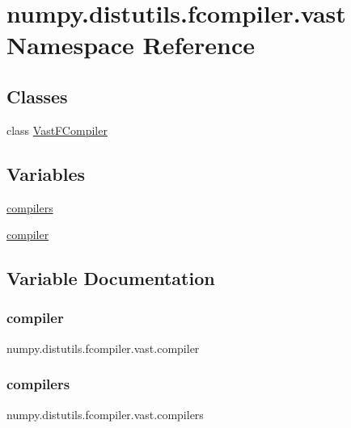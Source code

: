 \hypertarget{namespacenumpy_1_1distutils_1_1fcompiler_1_1vast}{}\section{numpy.\+distutils.\+fcompiler.\+vast Namespace Reference}
\label{namespacenumpy_1_1distutils_1_1fcompiler_1_1vast}
\subsection*{Classes}
\begin{DoxyCompactItemize}
\item 
class \hyperlink{classnumpy_1_1distutils_1_1fcompiler_1_1vast_1_1VastFCompiler}{Vast\+F\+Compiler}
\end{DoxyCompactItemize}
\subsection*{Variables}
\begin{DoxyCompactItemize}
\item 
\hyperlink{namespacenumpy_1_1distutils_1_1fcompiler_1_1vast_a63d584bbe7055d4c64f75986e80eb17b}{compilers}
\item 
\hyperlink{namespacenumpy_1_1distutils_1_1fcompiler_1_1vast_a17515405b8577a0686b6d8c0d8144f00}{compiler}
\end{DoxyCompactItemize}


\subsection{Variable Documentation}
\mbox{\label{namespacenumpy_1_1distutils_1_1fcompiler_1_1vast_a17515405b8577a0686b6d8c0d8144f00}} 
\subsubsection{\texorpdfstring{compiler}{compiler}}
{\footnotesize\ttfamily numpy.\+distutils.\+fcompiler.\+vast.\+compiler}

\mbox{\label{namespacenumpy_1_1distutils_1_1fcompiler_1_1vast_a63d584bbe7055d4c64f75986e80eb17b}} 
\subsubsection{\texorpdfstring{compilers}{compilers}}
{\footnotesize\ttfamily numpy.\+distutils.\+fcompiler.\+vast.\+compilers}

